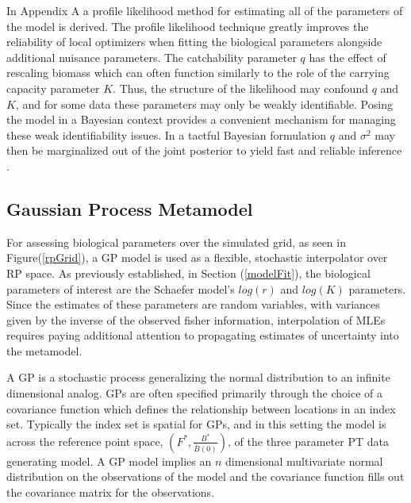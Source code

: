 \documentclass[12pt]{article}
\begin{document}
In Appendix A a profile likelihood method for estimating all of the 
parameters of the model is derived. The profile likelihood technique greatly 
improves the reliability of local optimizers when fitting the biological parameters 
alongside additional nuisance parameters. The catchability parameter $q$ has the 
effect of rescaling biomass which can often function similarly to the role of the 
carrying capacity parameter $K$. Thus, the structure of the likelihood may 
confound $q$ and $K$, and for some data these parameters may only be weakly 
identifiable. Posing the model in a Bayesian context provides a convenient 
mechanism for managing these weak identifiability issues. In a tactful Bayesian 
formulation $q$ and $\sigma^2$ may then be marginalized out of the joint posterior 
to yield fast and reliable inference . %


%  

%
\subsection{Gaussian Process Metamodel}
%

%
For assessing biological parameters over the simulated grid, as seen in 
Figure(\ref{rpGrid}), a GP model is used as a flexible, stochastic interpolator 
over RP space. As previously established, in Section (\ref{modelFit}), the 
biological parameters of interest are the Schaefer model's $log(r)$ and $log(K)$ 
parameters. Since the estimates of these parameters are random variables, with 
variances given by the inverse of the observed fisher information, 
interpolation of MLEs requires paying additional attention to propagating 
estimates of uncertainty into the metamodel. 


%
A GP is a stochastic process generalizing the normal distribution to an
infinite dimensional analog. GPs are often specified primarily through the
choice of a covariance function which defines the relationship between
locations in an index set. Typically the index set is spatial for GPs, and in
this setting the model is across the reference point space, 
$\left(F^*, \frac{B^*}{\bar B(0)}\right)$, of the three parameter
PT data generating model. A GP model implies an $n$ dimensional multivariate 
normal distribution on the observations of the model and the covariance function 
fills out the covariance matrix for the observations.
\end{document}
